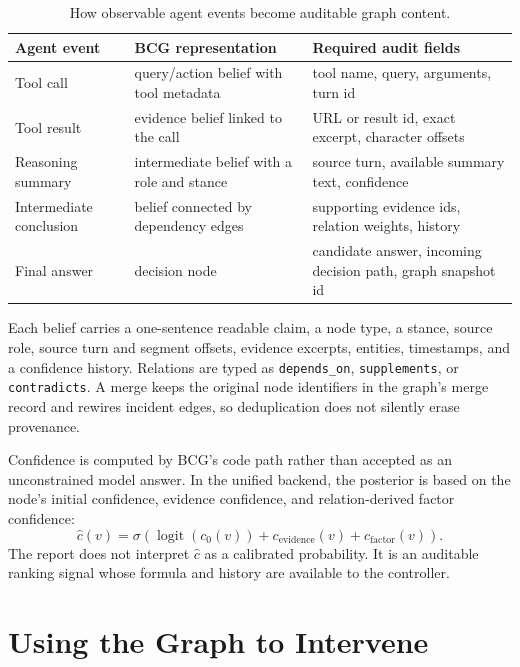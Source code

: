 \documentclass{article}
\begin{document}
\begin{table}[t]
\caption{How observable agent events become auditable graph content.}
\label{tab:nodes}
\centering
\small
\begin{tabularx}{\linewidth}{@{}lXX@{}}
\toprule
Agent event & BCG representation & Required audit fields \\
\midrule
Tool call & query/action belief with tool metadata &
tool name, query, arguments, turn id \\
Tool result & evidence belief linked to the call &
URL or result id, exact excerpt, character offsets \\
Reasoning summary & intermediate belief with a role and stance &
source turn, available summary text, confidence \\
Intermediate conclusion & belief connected by dependency edges &
supporting evidence ids, relation weights, history \\
Final answer & decision node &
candidate answer, incoming decision path, graph snapshot id \\
\bottomrule
\end{tabularx}
\end{table}

Each belief carries a one-sentence readable claim, a node type, a stance,
source role, source turn and segment offsets, evidence excerpts, entities,
timestamps, and a confidence history. Relations are typed as
\texttt{depends\_on}, \texttt{supplements}, or \texttt{contradicts}. A merge
keeps the original node identifiers in the graph's merge record and rewires
incident edges, so deduplication does not silently erase provenance.

Confidence is computed by BCG's code path rather than accepted as an
unconstrained model answer. In the unified backend, the posterior is based on
the node's initial confidence, evidence confidence, and relation-derived
factor confidence:
\begin{equation}\label{eq:confidence}
\hat{c}(v)=\sigma\left(
  \operatorname{logit}(c_0(v))
  + c_{\mathrm{evidence}}(v)
  + c_{\mathrm{factor}}(v)
\right).
\end{equation}
The report does not interpret $\hat{c}$ as a calibrated probability. It is an
auditable ranking signal whose formula and history are available to the
controller.

\section{Using the Graph to Intervene}\label{sec:intervention}
\end{document}
